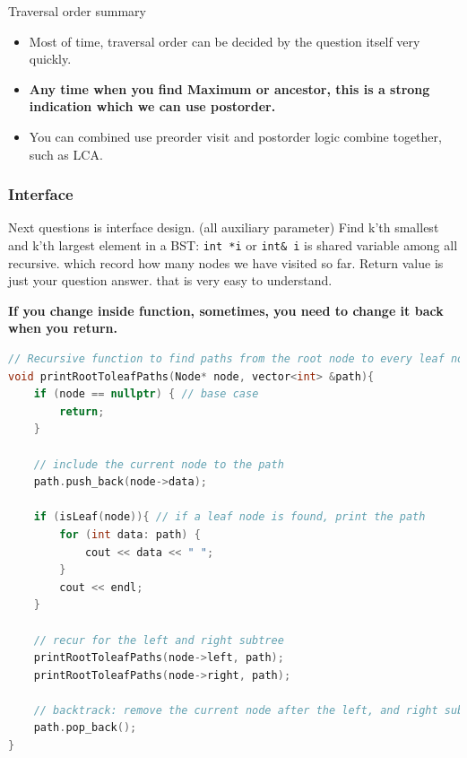 \documentclass[a4paper,11pt,twoside]{book}
\begin{document}
	\par Traversal order summary 
\begin{itemize}
	\item Most of time, traversal order can be decided by the question itself very quickly.
	
	\item \textbf{Any time when you find Maximum or ancestor, this is a strong indication which we can use postorder.}
	
	\item You can combined use preorder visit and postorder logic combine together, such as LCA. 
\end{itemize}





\subsubsection{Interface}


	\par Next questions is interface design. (all auxiliary parameter) Find k’th smallest and k’th largest element in a BST:  \texttt{int *i} or \texttt{int\& i} is shared variable among all recursive. which record how many nodes we have visited so far. Return value is just your question answer. that is very easy to understand. 
	

	\par \textbf{If you change inside function, sometimes, you need to change it back when you return.}
\begin{lstlisting}[frame=single, language=c++]
// Recursive function to find paths from the root node to every leaf node
void printRootToleafPaths(Node* node, vector<int> &path){
	if (node == nullptr) { // base case
		return;
	}
	
	// include the current node to the path
	path.push_back(node->data);
	
	if (isLeaf(node)){ // if a leaf node is found, print the path
		for (int data: path) {
			cout << data << " ";
		}
		cout << endl;
	}
	
	// recur for the left and right subtree
	printRootToleafPaths(node->left, path);
	printRootToleafPaths(node->right, path);
	
	// backtrack: remove the current node after the left, and right subtree are done
	path.pop_back();
}	
\end{lstlisting}
\end{document}
